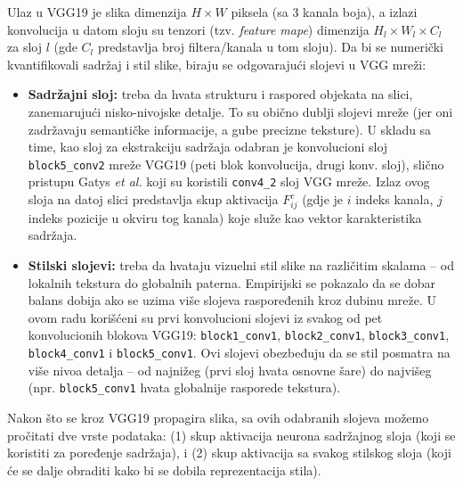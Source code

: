 \documentclass[a4paper,12pt]{article}
\begin{document}
Ulaz u VGG19 je slika dimenzija $H\times W$ piksela (sa 3 kanala boja), a izlazi konvolucija u datom sloju su tenzori (tzv. \emph{feature mape}) dimenzija $H_l\times W_l \times C_l$ za sloj $l$ (gde $C_l$ predstavlja broj filtera/kanala u tom sloju). Da bi se numerički kvantifikovali sadržaj i stil slike, biraju se odgovarajući slojevi u VGG mreži:
\begin{itemize}
\item \textbf{Sadržajni sloj:} treba da hvata strukturu i raspored objekata na slici, zanemarujući nisko-nivojske detalje. To su obično dublji slojevi mreže (jer oni zadržavaju semantičke informacije, a gube precizne teksture). U skladu sa time, kao sloj za ekstrakciju sadržaja odabran je konvolucioni sloj \texttt{block5\_conv2} mreže VGG19 (peti blok konvolucija, drugi konv. sloj), slično pristupu Gatys \emph{et al.} koji su koristili \texttt{conv4\_2} sloj VGG mreže. Izlaz ovog sloja na datoj slici predstavlja skup aktivacija $F^c_{ij}$ (gdje je $i$ indeks kanala, $j$ indeks pozicije u okviru tog kanala) koje služe kao vektor karakteristika sadržaja.

\item \textbf{Stilski slojevi:} treba da hvataju vizuelni stil slike na različitim skalama -- od lokalnih tekstura do globalnih paterna. Empirijski se pokazalo da se dobar balans dobija ako se uzima više slojeva raspoređenih kroz dubinu mreže. U ovom radu korišćeni su prvi konvolucioni slojevi iz svakog od pet konvolucionih blokova VGG19: \texttt{block1\_conv1}, \texttt{block2\_conv1}, \texttt{block3\_conv1}, \texttt{block4\_conv1} i \texttt{block5\_conv1}. Ovi slojevi obezbeđuju da se stil posmatra na više nivoa detalja -- od najnižeg (prvi sloj hvata osnovne šare) do najvišeg (npr. \texttt{block5\_conv1} hvata globalnije rasporede tekstura).
\end{itemize}
Nakon što se kroz VGG19 propagira slika, sa ovih odabranih slojeva možemo pročitati dve vrste podataka: (1) skup aktivacija neurona sadržajnog sloja (koji se koristiti za poređenje sadržaja), i (2) skup aktivacija sa svakog stilskog sloja (koji će se dalje obraditi kako bi se dobila reprezentacija stila).
\end{document}

